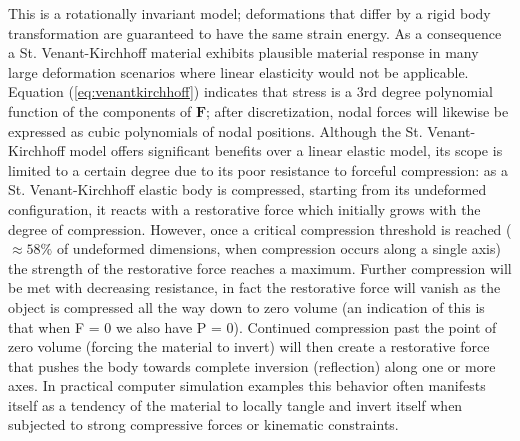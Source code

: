 This is a rotationally invariant model; deformations that differ by a rigid body transformation are guaranteed to have the same strain energy. As a 
consequence a St. Venant-Kirchhoff material exhibits plausible material response in many large deformation scenarios where linear elasticity would 
not be applicable. Equation (\ref{eq:venantkirchhoff}) indicates that stress is a 3rd degree polynomial function of the components of $\boldsymbol{F}$; 
after discretization, nodal forces will likewise be expressed as cubic polynomials of nodal positions.
Although the St. Venant-Kirchhoff model offers significant benefits over a linear elastic model, its scope is limited to a certain degree due to its 
poor resistance to forceful compression: as a St. Venant-Kirchhoff elastic body is compressed, starting from its undeformed configuration, it reacts 
with a restorative force which initially grows with the degree of compression. However, once a critical compression threshold is reached 
($\approx 58\%$ of undeformed dimensions, when compression occurs along a single axis) the strength of the restorative force reaches a maximum. Further
compression will be met with decreasing resistance, in fact the restorative force will vanish as the object is compressed all the way down to zero volume 
(an indication of this is that when F = 0 we also have P = 0). Continued compression past the point of zero volume (forcing the material to invert) will 
then create a restorative force that pushes the body towards complete inversion (reflection) along one or more axes. In practical computer simulation 
examples this behavior often manifests itself as a tendency of the material to locally tangle and invert itself when subjected to strong compressive forces 
or kinematic constraints.

 
 
 
 





\setlength{\unitlength}{\savedunitlength}
